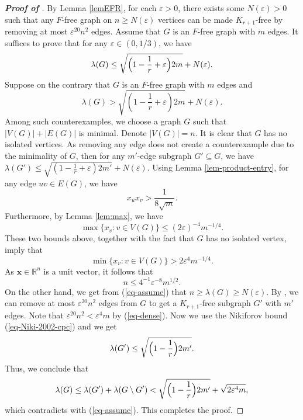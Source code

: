 \documentclass[11pt,a4paper]{article}
\theoremstyle{definition}
\theoremstyle{remark}
\begin{document}
\begin{proof}[{\bf Proof of }]
By Lemma \ref{lemEFR}, for each $\varepsilon > 0$, there exists some $N(\varepsilon) > 0$ such that any $F$-free graph on $n \geq N(\varepsilon)$ vertices can be made $K_{r + 1}$-free by removing at most $\varepsilon^{20} n^2$ edges. Assume that $G$ is an $F$-free graph with $m$ edges. 
It suffices to prove that for any $\varepsilon  \in (0,1/3)$, we have
$$\lambda(G)\le 
\sqrt{\Bigl(1-\frac{1}{r} + \varepsilon \Bigr)2m} + N(\varepsilon).$$ 
Suppose on the contrary that 
$G$ is an $F$-free graph with $m$ edges and 
\begin{equation} \label{eq-assume}
    \lambda (G)> \sqrt{\left(1-\frac{1}{r} + \varepsilon\right)2m} + N(\varepsilon).
\end{equation}
Among such counterexamples, we choose a graph $G$ such that $|V(G)| + |E(G)|$ is minimal. Denote $|V(G)|=n$. It is clear that $G$ has no isolated vertices. As removing any edge does not create a counterexample due to the minimality of $G$, 
then for any $m'$-edge subgraph $G' \subseteq G$, we have 
$\lambda (G')\le \sqrt{(1- \frac{1}{r} + \varepsilon)2m'} +N(\varepsilon)$. 
Using Lemma \ref{lem-product-entry},  
 for any edge $uv \in E(G)$, we have 
$$ x_ux_v > \frac{1}{8\sqrt{m}}.$$ 
Furthermore, by Lemma \ref{lem:max}, 
we have 
\[ \max \{x_v: v\in V(G)\}  \leq (2\varepsilon)^{-4}m^{-1/4}. \] 
These two bounds above, together with the fact that $G$ has no isolated vertex, imply that
$$\min \{ x_v: v\in V(G)\} > 2\varepsilon^4 m^{-1/4}.$$
As $\bm{x} \in \mathbb{R}^n$ is a unit vector, 
it follows that 
\begin{equation}
    \label{eq-dense}
    n \leq 4^{-1}\varepsilon^{-8} m^{1/2}.
\end{equation}
On the other hand, we get from (\ref{eq-assume}) that $n \geq \lambda(G) \geq N(\varepsilon)$. 
By , we can remove at most $\varepsilon^{20} n^2 $ edges from $G$ to get a $K_{r+1}$-free subgraph $G'$ with $m'$ edges. Note that $\varepsilon^{20} n^2 < \varepsilon^4 m$ by (\ref{eq-dense}). 
Now we use the Nikiforov bound (\ref{eq-Niki-2002-cpc}) and we get 
\[  \lambda (G') \le 
\sqrt{\Bigl(1-\frac{1}{r}\Bigr)2m'}. \]
Thus, we conclude that  
\begin{equation*}\label{eq:removal}
    \lambda(G) \le \lambda(G') + \lambda(G\setminus G') < \sqrt{\Bigl(1-\frac{1}{r}\Bigr)2m'} + \sqrt{2 \varepsilon^4 m}, 
\end{equation*}
which contradicts with (\ref{eq-assume}). This completes the proof. 
\end{proof}
\end{document}
